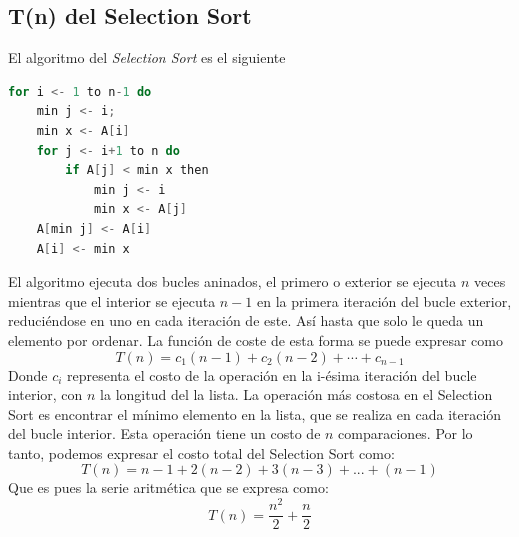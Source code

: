 \documentclass[14pt,a4paper]{report}
\begin{document}
\subsection*{T(n) del Selection Sort}
\quad El algoritmo del \textit{Selection Sort} es el siguiente
\begin{lstlisting}[language=C++]
for i <- 1 to n-1 do
	min j <- i;
	min x <- A[i]
	for j <- i+1 to n do
		if A[j] < min x then
			min j <- i
			min x <- A[j]
	A[min j] <- A[i]
	A[i] <- min x
\end{lstlisting}
\quad El algoritmo ejecuta  dos bucles aninados, el primero o exterior se ejecuta $n$ veces mientras que el interior se ejecuta $n-1$ en la primera iteración del bucle exterior, reduciéndose en uno en cada iteración de este. Así hasta que solo le queda un elemento por ordenar. La función de coste de esta forma se puede expresar como
\begin{equation*}
	T(n)=c_1(n-1)+c_2(n-2)+\cdots +c_{n-1}
\end{equation*}
Donde $c_i$ representa el costo de la operación en la i-ésima iteración del bucle interior, con $n$ la longitud del la lista.
La operación más costosa en el Selection Sort es encontrar el mínimo elemento en la lista, que se realiza en cada iteración del bucle interior. Esta operación tiene un costo de $n$ comparaciones. Por lo tanto, podemos expresar el costo total del Selection Sort como:
\begin{equation*}
T(n) = n-1 + 2(n-2) + 3(n-3) + ... + (n-1)
\end{equation*}
Que es pues la serie aritmética que se expresa como:
\begin{equation*}
	T(n)=\frac{n^2}{2}+\frac{n}{2}
\end{equation*}
\newpage
\end{document}
